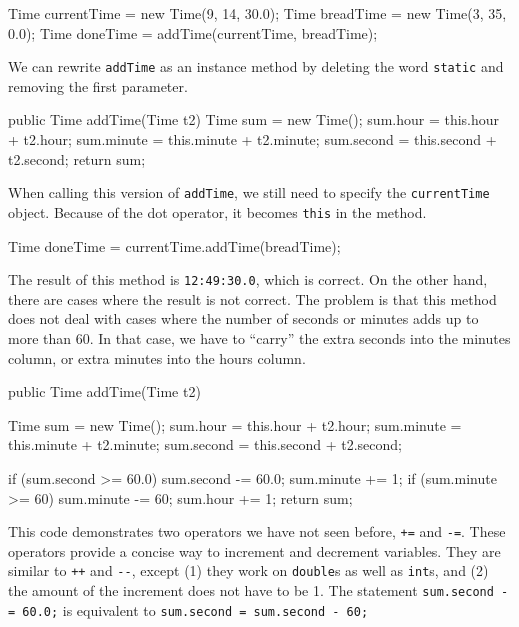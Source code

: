 \documentclass[12pt]{book}
\theoremstyle{exercise}
\newcommand{\java}[1]{\verb"#1"}
\newcommand{\java}[1]{\lstinline{#1}} %
\begin{document}
\begin{code}
    Time currentTime = new Time(9, 14, 30.0);
    Time breadTime = new Time(3, 35, 0.0);
    Time doneTime = addTime(currentTime, breadTime);
\end{code}

We can rewrite \java{addTime} as an instance method by deleting the word \java{static} and removing the first parameter.

\begin{code}
    public Time addTime(Time t2) {
        Time sum = new Time();
        sum.hour = this.hour + t2.hour;
        sum.minute = this.minute + t2.minute;
        sum.second = this.second + t2.second;
        return sum;
    }
\end{code}

When calling this version of \java{addTime}, we still need to specify the \java{currentTime} object.
Because of the dot operator, it becomes \java{this} in the method.

\begin{code}
    Time doneTime = currentTime.addTime(breadTime);
\end{code}

The result of this method is {\tt 12:49:30.0}, which is correct.
On the other hand, there are cases where the result is not correct.
The problem is that this method does not deal with cases where the number of seconds or minutes adds up to more than 60.
In that case, we have to ``carry'' the extra seconds into the minutes column, or extra minutes into the hours column.

\begin{code}
    public Time addTime(Time t2) {
        Time sum = new Time();
        sum.hour = this.hour + t2.hour;
        sum.minute = this.minute + t2.minute;
        sum.second = this.second + t2.second;

        if (sum.second >= 60.0) {
            sum.second -= 60.0;
            sum.minute += 1;
        }
        if (sum.minute >= 60) {
            sum.minute -= 60;
            sum.hour += 1;
        }
        return sum;
    }
\end{code}


This code demonstrates two operators we have not seen before, \java{+=} and \java{-=}.
These operators provide a concise way to increment and decrement variables.
They are similar to \java{++} and \java{--}, except (1) they work on \java{double}s as well as \java{int}s, and (2) the amount of the increment does not have to be 1.
The statement \java{sum.second -= 60.0;} is equivalent to \java{sum.second = sum.second - 60;}
\end{document}

